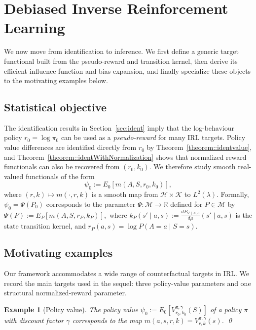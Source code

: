\documentclass[12pt]{article}
\theoremstyle{plain}
\newtheorem{example}{Example}
\begin{document}
\section{Debiased Inverse Reinforcement Learning}

We now move from identification to inference. We first define a generic target
functional built from the pseudo-reward and transition kernel, then derive its
efficient influence function and bias expansion, and finally specialize these
objects to the motivating examples below.

\subsection{Statistical objective}
\label{sec::statobj}

The identification results in Section~\ref{sec:ident} imply that the
log-behaviour policy $r_0 = \log \pi_0$ can be used as a \emph{pseudo-reward}
for many IRL targets. Policy value differences are identified directly from
$r_0$ by Theorem~\ref{theorem::identvalue}, and
Theorem~\ref{theorem::identWithNormalization} shows that normalized reward
functionals can also be recovered from \((r_0,k_0)\). We therefore study
smooth real-valued functionals of the form
\[
\psi_0 := E_0[m(A,S,r_0,k_0)],
\]
where $(r,k)\mapsto m(\cdot,r,k)$ is a smooth map 
from $\mathcal{H}\times\mathcal{K}$ to $L^2(\lambda)$.
Formally, $\psi_0 = \Psi(P_0)$ corresponds to the parameter 
$\Psi:\mathcal{M}\to\mathbb{R}$ defined for $P\in\mathcal{M}$ by $\Psi(P) := E_P[m(A,S,r_P,k_P)],$ where $k_P(s'\mid a,s) := \tfrac{dP_{S'\mid A,S}}{d\mu}(s'\mid a,s)$ is the 
state transition kernel, and $r_P(a,s) = \log P(A=a \mid S = s)$.

\subsection{Motivating examples}
\label{subsec:examples}

Our framework accommodates a wide range of counterfactual targets in IRL.
We record the main targets used in the sequel: three policy-value parameters
and one structural normalized-reward parameter.  

\renewcommand{\theexample}{1a}
\begin{example}[Policy value]
\label{example::1a}
The policy value $\psi_0 := E_0[V_{r_0,k_0}^{\pi,\gamma}(S)]$ of a
policy $\pi$ with discount factor $\gamma$ corresponds to the map
$m(a,s,r,k) = V_{r,k}^{\pi,\gamma}(s)$.  
\qed
\end{example}
\end{document}
